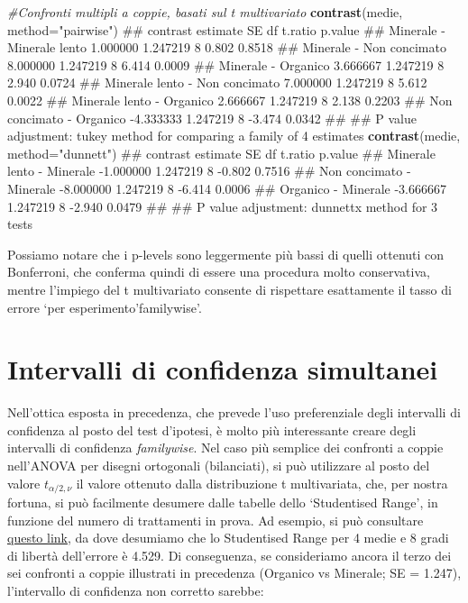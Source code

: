 \documentclass[a4paper,12pt,oneside]{book}
\newenvironment{Shaded}{\begin{snugshade}}{\end{snugshade}}
\newcommand{\KeywordTok}[1]{\textcolor[rgb]{0.13,0.29,0.53}{\textbf{#1}}}
\newcommand{\DataTypeTok}[1]{\textcolor[rgb]{0.13,0.29,0.53}{#1}}
\newcommand{\StringTok}[1]{\textcolor[rgb]{0.31,0.60,0.02}{#1}}
\newcommand{\CommentTok}[1]{\textcolor[rgb]{0.56,0.35,0.01}{\textit{#1}}}
\newcommand{\NormalTok}[1]{#1}
\theoremstyle{definition}
\theoremstyle{definition}
\theoremstyle{definition}
\theoremstyle{remark}
\begin{document}
\small

\begin{Shaded}
\begin{Highlighting}[]
\CommentTok{#Confronti multipli a coppie, basati sul t multivariato}
\KeywordTok{contrast}\NormalTok{(medie, }\DataTypeTok{method=}\StringTok{"pairwise"}\NormalTok{)}
\NormalTok{##  contrast                        estimate       SE df t.ratio p.value}
\NormalTok{##  Minerale - Minerale lento       1.000000 1.247219  8   0.802  0.8518}
\NormalTok{##  Minerale - Non concimato        8.000000 1.247219  8   6.414  0.0009}
\NormalTok{##  Minerale - Organico             3.666667 1.247219  8   2.940  0.0724}
\NormalTok{##  Minerale lento - Non concimato  7.000000 1.247219  8   5.612  0.0022}
\NormalTok{##  Minerale lento - Organico       2.666667 1.247219  8   2.138  0.2203}
\NormalTok{##  Non concimato - Organico       -4.333333 1.247219  8  -3.474  0.0342}
\NormalTok{## }
\NormalTok{## P value adjustment: tukey method for comparing a family of 4 estimates}
\KeywordTok{contrast}\NormalTok{(medie, }\DataTypeTok{method=}\StringTok{"dunnett"}\NormalTok{)}
\NormalTok{##  contrast                   estimate       SE df t.ratio p.value}
\NormalTok{##  Minerale lento - Minerale -1.000000 1.247219  8  -0.802  0.7516}
\NormalTok{##  Non concimato - Minerale  -8.000000 1.247219  8  -6.414  0.0006}
\NormalTok{##  Organico - Minerale       -3.666667 1.247219  8  -2.940  0.0479}
\NormalTok{## }
\NormalTok{## P value adjustment: dunnettx method for 3 tests}
\end{Highlighting}
\end{Shaded}

\normalsize

Possiamo notare che i p-levels sono leggermente più bassi di quelli
ottenuti con Bonferroni, che conferma quindi di essere una procedura
molto conservativa, mentre l'impiego del t multivariato consente di
rispettare esattamente il tasso di errore `per esperimento'familywise'.

\section{Intervalli di confidenza
simultanei}\label{intervalli-di-confidenza-simultanei}

Nell'ottica esposta in precedenza, che prevede l'uso preferenziale degli
intervalli di confidenza al posto del test d'ipotesi, è molto più
interessante creare degli intervalli di confidenza \emph{familywise}.
Nel caso più semplice dei confronti a coppie nell'ANOVA per disegni
ortogonali (bilanciati), si può utilizzare al posto del valore
\(t_{\alpha/2, \nu}\) il valore ottenuto dalla distribuzione t
multivariata, che, per nostra fortuna, si può facilmente desumere dalle
tabelle dello `Studentised Range', in funzione del numero di trattamenti
in prova. Ad esempio, si può consultare
\href{http://davidmlane.com/hyperstat/sr_table.html}{questo link}, da
dove desumiamo che lo Studentised Range per 4 medie e 8 gradi di libertà
dell'errore è 4.529. Di conseguenza, se consideriamo ancora il terzo dei
sei confronti a coppie illustrati in precedenza (Organico vs Minerale;
SE = 1.247), l'intervallo di confidenza non corretto sarebbe:
\end{document}
